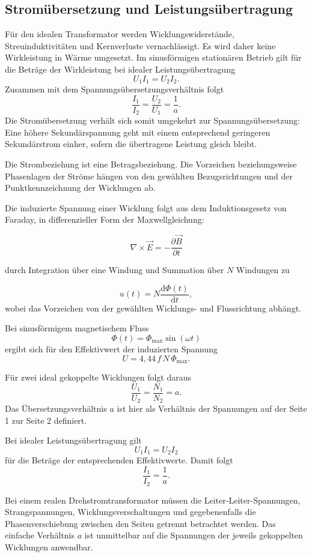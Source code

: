 \subsection{Stromübersetzung und Leistungsübertragung}

Für den idealen Transformator werden Wicklungswiderstände,
Streuinduktivitäten und Kernverluste vernachlässigt. Es wird
daher keine Wirkleistung in Wärme umgesetzt. Im sinusförmigen
stationären Betrieb gilt für die Beträge der Wirkleistung bei
idealer Leistungsübertragung
\[
    U_1 I_1 = U_2 I_2.
\]
Zusammen mit dem Spannungsübersetzungsverhältnis folgt
\[
    \boxed{\frac{I_1}{I_2}=\frac{U_2}{U_1}=\frac{1}{a}.}
\]
Die Stromübersetzung verhält sich somit umgekehrt zur
Spannungsübersetzung: Eine höhere Sekundärspannung geht mit
einem entsprechend geringeren Sekundärstrom einher, sofern die
übertragene Leistung gleich bleibt.

Die Strombeziehung ist eine Betragsbeziehung. Die Vorzeichen
beziehungsweise Phasenlagen der Ströme hängen von den gewählten
Bezugsrichtungen und der Punktkennzeichnung der Wicklungen ab.


Die induzierte Spannung einer Wicklung folgt aus dem Induktionsgesetz von
Faraday, in differenzieller Form der Maxwellgleichung:

\[
        \nabla \times \vec{E}
        = -\frac{\partial \vec{B}}{\partial t}
\]

durch Integration über eine Windung und Summation über $N$ Windungen zu

\[
  u(t)=N\frac{\mathrm d\Phi(t)}{\mathrm dt},
\]
wobei das Vorzeichen von der gewählten Wicklungs- und Flussrichtung abhängt.

Bei sinusförmigem magnetischem Fluss
\[
  \Phi(t)=\Phi_{\max}\sin(\omega t)
\]
ergibt sich für den Effektivwert der induzierten Spannung
\[
  U=4{,}44\,f\,N\,\Phi_{\max}.
\]

Für zwei ideal gekoppelte Wicklungen folgt daraus
\[
  \frac{U_1}{U_2}=\frac{N_1}{N_2}=a.
\]
Das Übersetzungsverhältnis \(a\) ist hier als Verhältnis der Spannungen
auf der Seite 1 zur Seite 2 definiert.

Bei idealer Leistungsübertragung gilt
\[
  U_1 I_1=U_2 I_2
\]
für die Beträge der entsprechenden Effektivwerte. Damit folgt
\[
  \frac{I_1}{I_2}=\frac{1}{a}.
\]

Bei einem realen Drehstromtransformator müssen die Leiter-Leiter-Spannungen,
Strangspannungen, Wicklungsverschaltungen und gegebenenfalls die Phasenverschiebung
zwischen den Seiten getrennt betrachtet werden. Das einfache Verhältnis \(a\)
ist unmittelbar auf die Spannungen der jeweils gekoppelten Wicklungen anwendbar.

